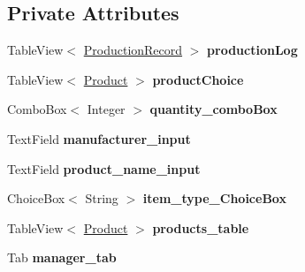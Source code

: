 \subsection*{Private Attributes}
\begin{DoxyCompactItemize}
\item 
\mbox{\label{class_g_u_i_project_1_1_controller_a2c1a8410c6a649de4a8ac1e404e2ba78}} 
Table\+View$<$ \mbox{\hyperlink{class_g_u_i_project_1_1_production_record}{Production\+Record}} $>$ {\bfseries production\+Log}
\item 
\mbox{\label{class_g_u_i_project_1_1_controller_a256788a6a034785e780e1e12088c13a9}} 
Table\+View$<$ \mbox{\hyperlink{class_g_u_i_project_1_1_product}{Product}} $>$ {\bfseries product\+Choice}
\item 
\mbox{\label{class_g_u_i_project_1_1_controller_a9db334a34fd72f260fe8aa724cc77cb6}} 
Combo\+Box$<$ Integer $>$ {\bfseries quantity\+\_\+combo\+Box}
\item 
\mbox{\label{class_g_u_i_project_1_1_controller_a69637a3db63dd475b2808762a7794eee}} 
Text\+Field {\bfseries manufacturer\+\_\+input}
\item 
\mbox{\label{class_g_u_i_project_1_1_controller_a6f8ddfb493bea51acb6badc77a93bc9a}} 
Text\+Field {\bfseries product\+\_\+name\+\_\+input}
\item 
\mbox{\label{class_g_u_i_project_1_1_controller_a13b92ac0ea319eb7965cafedcccb07f0}} 
Choice\+Box$<$ String $>$ {\bfseries item\+\_\+type\+\_\+\+Choice\+Box}
\item 
\mbox{\label{class_g_u_i_project_1_1_controller_a0aea0219cad7f0675a6520bd878b9369}} 
Table\+View$<$ \mbox{\hyperlink{class_g_u_i_project_1_1_product}{Product}} $>$ {\bfseries products\+\_\+table}
\item 
\mbox{\label{class_g_u_i_project_1_1_controller_a57e762d343a8320d586dc13ba78b1c3e}} 
Tab {\bfseries manager\+\_\+tab}
\item 

\end{DoxyCompactItemize}
